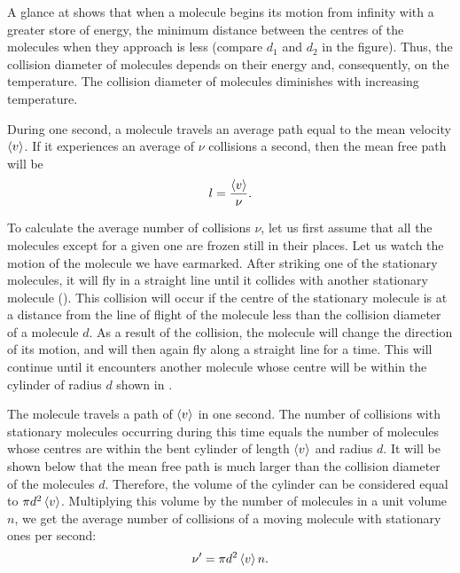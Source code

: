 A glance at  shows that when a molecule begins its motion from infinity with a greater store of energy, the minimum distance between the centres of the molecules when they approach is less (compare $d_1$ and $d_2$ in the figure). Thus, the collision diameter of molecules depends on their energy and, consequently, on the temperature. The collision diameter of molecules diminishes with increasing temperature.

During one second, a molecule travels an average path equal to the mean velocity $\left\langle v \right\rangle$. If it experiences an average of $\nu$ collisions a second, then the mean free path will be
\begin{equation}\label{eq:16_7}
    l = \frac{\left\langle v \right\rangle}{\nu}.
\end{equation}

To calculate the average number of collisions $\nu$, let us first assume that all the molecules except for a given one are frozen still in their places. Let us watch the motion of the molecule we have earmarked. After striking one of the stationary molecules, it will fly in a straight line until it collides with another stationary molecule (). This collision will occur if the centre of the stationary molecule is at a distance from the line of flight of the molecule less than the collision diameter of a molecule $d$. As a result of the collision, the molecule will change the direction of its motion, and will then again fly along a straight line for a time. This will continue until it encounters another molecule whose centre will be within the cylinder of radius $d$ shown in .

The molecule travels a path of $\left\langle v \right\rangle$ in one second. The number of collisions with stationary molecules occurring during this time equals the number of molecules whose centres are within the bent cylinder of length $\left\langle v \right\rangle$ and radius $d$. It will be shown below that the mean free path is much larger than the collision diameter of the molecules $d$. Therefore, the volume of the cylinder can be considered equal to $\pi d^2\left\langle v \right\rangle$. Multiplying this volume by the number of molecules in a unit volume $n$, we get the average number of collisions of a moving molecule with stationary ones per second:
\begin{equation}\label{eq:16_8}
    \nu' = \pi d^2 \left\langle v \right\rangle n.
\end{equation}

